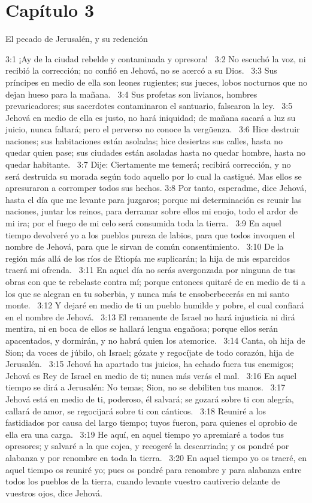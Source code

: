 \section*{Capítulo 3 }
El pecado de Jerusalén, y su redención  

3:1 ¡Ay de la ciudad rebelde y contaminada y opresora!  
3:2 No escuchó la voz, ni recibió la corrección; no confió en Jehová, no se acercó a su Dios.  
3:3 Sus príncipes en medio de ella son leones rugientes; sus jueces, lobos nocturnos que no dejan hueso para la mañana.  
3:4 Sus profetas son livianos, hombres prevaricadores; sus sacerdotes contaminaron el santuario, falsearon la ley.  
3:5 Jehová en medio de ella es justo, no hará iniquidad; de mañana sacará a luz su juicio, nunca faltará; pero el perverso no conoce la vergüenza.  
3:6 Hice destruir naciones; sus habitaciones están asoladas; hice desiertas sus calles, hasta no quedar quien pase; sus ciudades están asoladas hasta no quedar hombre, hasta no quedar habitante.  
3:7 Dije: Ciertamente me temerá; recibirá corrección, y no será destruida su morada según todo aquello por lo cual la castigué. Mas ellos se apresuraron a corromper todos sus hechos. 
3:8 Por tanto, esperadme, dice Jehová, hasta el día que me levante para juzgaros; porque mi determinación es reunir las naciones, juntar los reinos, para derramar sobre ellos mi enojo, todo el ardor de mi ira; por el fuego de mi celo será consumida toda la tierra.  
3:9 En aquel tiempo devolveré yo a los pueblos pureza de labios, para que todos invoquen el nombre de Jehová, para que le sirvan de común consentimiento.  
3:10 De la región más allá de los ríos de Etiopía me suplicarán; la hija de mis esparcidos traerá mi ofrenda.  
3:11 En aquel día no serás avergonzada por ninguna de tus obras con que te rebelaste contra mí; porque entonces quitaré de en medio de ti a los que se alegran en tu soberbia, y nunca más te ensoberbecerás en mi santo monte.  
3:12 Y dejaré en medio de ti un pueblo humilde y pobre, el cual confiará en el nombre de Jehová.  
3:13 El remanente de Israel no hará injusticia ni dirá mentira, ni en boca de ellos se hallará lengua engañosa; porque ellos serán apacentados, y dormirán, y no habrá quien los atemorice.  
3:14 Canta, oh hija de Sion; da voces de júbilo, oh Israel; gózate y regocíjate de todo corazón, hija de Jerusalén.  
3:15 Jehová ha apartado tus juicios, ha echado fuera tus enemigos; Jehová es Rey de Israel en medio de ti; nunca más verás el mal.  
3:16 En aquel tiempo se dirá a Jerusalén: No temas; Sion, no se debiliten tus manos.  
3:17 Jehová está en medio de ti, poderoso, él salvará; se gozará sobre ti con alegría, callará de amor, se regocijará sobre ti con cánticos.  
3:18 Reuniré a los fastidiados por causa del largo tiempo; tuyos fueron, para quienes el oprobio de ella era una carga.  
3:19 He aquí, en aquel tiempo yo apremiaré a todos tus opresores; y salvaré a la que cojea, y recogeré la descarriada; y os pondré por alabanza y por renombre en toda la tierra.  
3:20 En aquel tiempo yo os traeré, en aquel tiempo os reuniré yo; pues os pondré para renombre y para alabanza entre todos los pueblos de la tierra, cuando levante vuestro cautiverio delante de vuestros ojos, dice Jehová.
